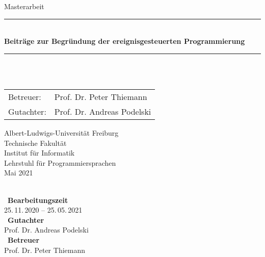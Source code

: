 \begin{titlepage}
\begin{center}

\newcommand{\HorizontalLine}{\rule{\linewidth}{0.3mm}}

{\Large Masterarbeit}\\[1.3cm]


\HorizontalLine \\[0.4cm]
{ \huge \bfseries  Beiträge zur Begründung der ereignisgesteuerten Programmierung }
\HorizontalLine \\[1.5cm]


{\Huge \theauthor} \\[2cm]


\begin{tabular}[hc]{>{\huge}l >{\huge}l}
  Betreuer: & Prof. Dr. Peter Thiemann \\[0.3cm]
  Gutachter: & Prof. Dr. Andreas Podelski \\[1.2cm]
\end{tabular}
\vfill  %

\Large {
    Albert-Ludwigs-Universität Freiburg\\
    Technische Fakultät\\
    Institut für Informatik\\
    Lehrstuhl für Programmiersprachen\\[1cm]

    Mai 2021
    \\
}
\end{center}
\end{titlepage}

\thispagestyle{empty}
\ \vfill \ \\  %
\
\textbf{Bearbeitungszeit}            \smallskip{} \\
25.\,11.\,2020 -- 25.\,05.\,2021   \bigskip{} \\
\
\textbf{Gutachter}                  \smallskip{} \\
Prof. Dr. Andreas Podelski               \bigskip{} \\
\
\textbf{Betreuer}                  \smallskip{} \\
Prof. Dr. Peter Thiemann
